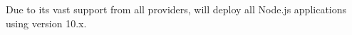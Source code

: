 Due to its vast support from all providers, \sys will deploy all Node.js applications using version 10.x. 

